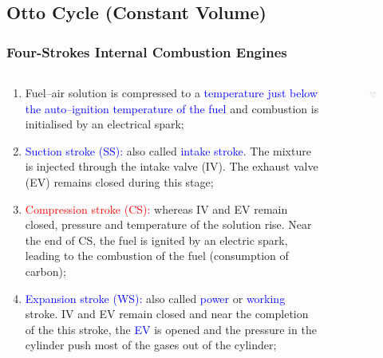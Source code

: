 \documentclass[10pt,compress]{beamer}
\newcommand{\red}{\textcolor{red}}
\newcommand{\blue}{\textcolor{blue}}
\begin{document}
\subsection{Otto Cycle (Constant Volume)}

\begin{frame}
 \frametitle{Four-Strokes Internal Combustion Engines}
  \begin{columns}
   \begin{column}[c]{0.4\linewidth}
    \begin{enumerate}[(1)]\scriptsize
     \item<1-> Fuel--air solution is compressed to a \blue{temperature just below the auto--ignition temperature of the fuel} and combustion is initialised by an electrical spark;
     \item<2-> \blue{Suction stroke (SS):} also called \blue{intake stroke}. The mixture is injected through the intake valve (IV). The exhaust valve (EV) remains closed during this stage;
     \item<3-> \red{Compression stroke (CS):} whereas IV and EV remain closed, pressure and temperature of the solution rise. Near the end of CS, the fuel is ignited by an electric spark, leading to the combustion of the fuel (consumption of carbon);
     \item<4-> \blue{Expansion stroke (WS):} also called \blue{power} or \blue{working} stroke. IV and EV remain closed and near the completion of the this stroke, the \blue{EV} is opened and the pressure in the cylinder push most of the gases out of the cylinder;
    \end{enumerate}
   \end{column}
   \begin{column}[c]{0.6\linewidth}
    \begin{figure}%
     \begin{center}
      \includegraphics[width=6.5cm,clip]{./Pics/InternalCombustion_4Strokes_Otto}

\end{center}
\end{figure}
\end{column}
\end{columns}
\end{frame}
\end{document}
